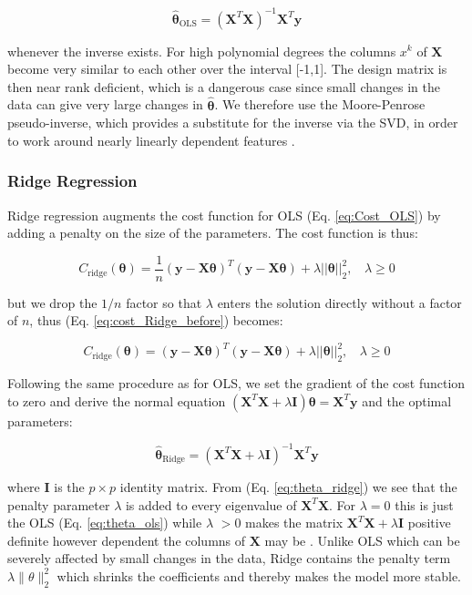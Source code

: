 \documentclass[reprint,english,notitlepage]{revtex4-2}  %
\begin{document}
\begin{equation}\label{eq:theta_ols}
\bm{\hat{\theta}}_\text{OLS} = (\bm{X}^T\bm{X})^{-1}\bm{X}^T \bm{y} 
\end{equation}

whenever the inverse exists. For high polynomial degrees the columns $x^k$ of $\bm{X}$ become very similar to each other over the interval [-1,1]. The design matrix is then near rank deficient, which is a dangerous case since small changes in the data can give very large changes in $\bm{\hat{\theta}}$. We therefore use the Moore-Penrose pseudo-inverse, which provides a substitute for the inverse via the SVD, in order to work around nearly linearly dependent features \cite{lecture_book}.


\subsubsection{Ridge Regression}

Ridge regression augments the cost function for OLS (Eq. \ref{eq:Cost_OLS}) by adding a penalty on the size of the parameters. The cost function is thus:

\begin{equation}\label{eq:cost_Ridge_before}
    C_\text{ridge}(\bm{\theta}) = \frac{1}{n}(\bm{y} - \bm{X\theta})^T(\bm{y} - \bm{X\theta}) + \lambda || \bm{\theta}||_2^2, \ \ \ \ \lambda \geq 0
\end{equation} 

but we drop the $1/n$ factor so that $\lambda$ enters the solution directly without a factor of $n$, thus (Eq. \ref{eq:cost_Ridge_before}) becomes:

\begin{equation}
    C_\text{ridge}(\bm{\theta}) = (\bm{y} - \bm{X\theta})^T(\bm{y} - \bm{X\theta}) + \lambda || \bm{\theta}||_2^2, \ \ \ \ \lambda \geq 0
\end{equation}

Following the same procedure as for OLS, we set the gradient of the cost function to zero and derive the normal equation $\left(\bm{X}^T\bm{X} + \lambda\bm{I}\right)\bm{\theta} = \bm{X}^T\bm{y}$ and the optimal parameters:

\begin{equation}\label{eq:theta_ridge}
\bm{\hat{\theta}}_\text{Ridge} = (\bm{X}^T\bm{X} + \lambda \bm{I})^{-1}\bm{X}^T \bm{y}
\end{equation}

where $\bm{I}$ is the $p \times p$ identity matrix. From (Eq. \ref{eq:theta_ridge}) we see that the penalty parameter $\lambda$ is added to every eigenvalue of $\bm{X}^T\bm{X}$. For $\lambda=0$ this is just the OLS (Eq. \ref{eq:theta_ols}) while $\lambda$ $> 0$ makes the matrix $\bm{X}^T\bm{X} + \lambda \bm{I}$ positive definite however dependent the columns of $\bm{X}$ may be \cite{lecture_book}. Unlike OLS which can be severely affected by small changes in the data, Ridge contains the penalty term $\lambda\|\theta\|_2^2$ which shrinks the coefficients and thereby makes the model more stable.
\end{document}
